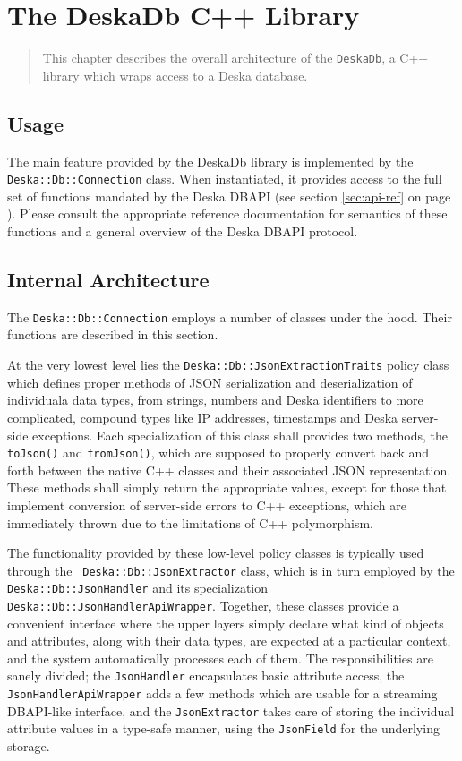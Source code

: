 \documentclass[deska]{subfiles}
\begin{document}
\chapter{The DeskaDb C++ Library}

\begin{abstract}
This chapter describes the overall architecture of the {\tt DeskaDb}, a C++ library which wraps access to a Deska
database.
\end{abstract}

\section{Usage}

The main feature provided by the DeskaDb library is implemented by the {\tt Deska::Db::Connection} class.  When
instantiated, it provides access to the full set of functions mandated by the Deska DBAPI (see section \ref{sec:api-ref}
on page \pageref{sec:api-ref}).  Please consult the appropriate reference documentation for semantics of these functions
and a general overview of the Deska DBAPI protocol.

\section{Internal Architecture}

The {\tt Deska::Db::Connection} employs a number of classes under the hood.  Their functions are described in this
section.

At the very lowest level lies the {\tt Deska::Db::JsonExtractionTraits} policy class which defines proper methods of
JSON serialization and deserialization of individuala data types, from strings, numbers and Deska identifiers to more
complicated, compound types like IP addresses, timestamps and Deska server-side exceptions.  Each specialization of this
class shall provides two methods, the {\tt toJson()} and {\tt fromJson()}, which are supposed to properly convert back
and forth between the native C++ classes and their associated JSON representation.  These methods shall simply return
the appropriate values, except for those that implement conversion of server-side errors to C++ exceptions, which are
immediately thrown due to the limitations of C++ polymorphism.

The functionality provided by these low-level policy classes is typically used through the {\tt
Deska::Db::JsonExtractor} class, which is in turn employed by the {\tt Deska::Db::JsonHandler} and its specialization
{\tt Deska::Db::JsonHandlerApiWrapper}.  Together, these classes provide a convenient interface where the upper layers
simply declare what kind of objects and attributes, along with their data types, are expected at a particular context,
and the system automatically processes each of them.  The responsibilities are sanely divided; the {\tt JsonHandler}
encapsulates basic attribute access, the {\tt JsonHandlerApiWrapper} adds a few methods which are usable for a streaming
DBAPI-like interface, and the {\tt JsonExtractor} takes care of storing the individual attribute values in a type-safe
manner, using the {\tt JsonField} for the underlying storage.
\end{document}

